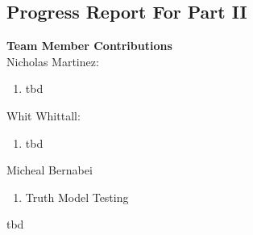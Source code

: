 \documentclass[paper=a4, fontsize=11pt]{scrartcl} %
\numberwithin{equation}{section} %
\numberwithin{figure}{section} %
\numberwithin{table}{section} %
\begin{document}
\newpage


%
\subsection{Progress Report For Part II}
\begin{framed}

\textbf{Team Member Contributions} \\
Nicholas Martinez:
\begin{enumerate}
    \item tbd
\end{enumerate}
Whit Whittall:
\begin{enumerate}
    \item tbd
\end{enumerate}
Micheal Bernabei
\begin{enumerate}
    \item Truth Model Testing 
\end{enumerate}

 tbd

\end{framed}


\newpage
\end{document}
